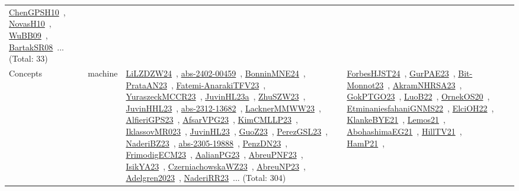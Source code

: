 {\begin{longtable}{lp{3cm}>{\raggedright\arraybackslash}p{6cm}>{\raggedright\arraybackslash}p{6cm}>{\raggedright\arraybackslash}p{8cm}}
\href{../works/ChenGPSH10.pdf}{ChenGPSH10}~\cite{ChenGPSH10}, \href{../works/NovasH10.pdf}{NovasH10}~\cite{NovasH10}, \href{../works/WuBB09.pdf}{WuBB09}~\cite{WuBB09}, \href{../works/BartakSR08.pdf}{BartakSR08}~\cite{BartakSR08}... (Total: 33)\\
\index{machine}\index{Concepts!machine}Concepts & machine & \href{../works/LiLZDZW24.pdf}{LiLZDZW24}~\cite{LiLZDZW24}, \href{../works/abs-2402-00459.pdf}{abs-2402-00459}~\cite{abs-2402-00459}, \href{../works/BonninMNE24.pdf}{BonninMNE24}~\cite{BonninMNE24}, \href{../works/PrataAN23.pdf}{PrataAN23}~\cite{PrataAN23}, \href{../works/Fatemi-AnarakiTFV23.pdf}{Fatemi-AnarakiTFV23}~\cite{Fatemi-AnarakiTFV23}, \href{../works/YuraszeckMCCR23.pdf}{YuraszeckMCCR23}~\cite{YuraszeckMCCR23}, \href{../works/JuvinHL23a.pdf}{JuvinHL23a}~\cite{JuvinHL23a}, \href{../works/ZhuSZW23.pdf}{ZhuSZW23}~\cite{ZhuSZW23}, \href{../works/JuvinHHL23.pdf}{JuvinHHL23}~\cite{JuvinHHL23}, \href{../works/abs-2312-13682.pdf}{abs-2312-13682}~\cite{abs-2312-13682}, \href{../works/LacknerMMWW23.pdf}{LacknerMMWW23}~\cite{LacknerMMWW23}, \href{../works/AlfieriGPS23.pdf}{AlfieriGPS23}~\cite{AlfieriGPS23}, \href{../works/AfsarVPG23.pdf}{AfsarVPG23}~\cite{AfsarVPG23}, \href{../works/KimCMLLP23.pdf}{KimCMLLP23}~\cite{KimCMLLP23}, \href{../works/IklassovMR023.pdf}{IklassovMR023}~\cite{IklassovMR023}, \href{../works/JuvinHL23.pdf}{JuvinHL23}~\cite{JuvinHL23}, \href{../works/GuoZ23.pdf}{GuoZ23}~\cite{GuoZ23}, \href{../works/PerezGSL23.pdf}{PerezGSL23}~\cite{PerezGSL23}, \href{../works/NaderiBZ23.pdf}{NaderiBZ23}~\cite{NaderiBZ23}, \href{../works/abs-2305-19888.pdf}{abs-2305-19888}~\cite{abs-2305-19888}, \href{../works/PenzDN23.pdf}{PenzDN23}~\cite{PenzDN23}, \href{../works/FrimodigECM23.pdf}{FrimodigECM23}~\cite{FrimodigECM23}, \href{../works/AalianPG23.pdf}{AalianPG23}~\cite{AalianPG23}, \href{../works/AbreuPNF23.pdf}{AbreuPNF23}~\cite{AbreuPNF23}, \href{../works/IsikYA23.pdf}{IsikYA23}~\cite{IsikYA23}, \href{../works/CzerniachowskaWZ23.pdf}{CzerniachowskaWZ23}~\cite{CzerniachowskaWZ23}, \href{../works/AbreuNP23.pdf}{AbreuNP23}~\cite{AbreuNP23}, \href{../works/Adelgren2023.pdf}{Adelgren2023}~\cite{Adelgren2023}, \href{../works/NaderiRR23.pdf}{NaderiRR23}~\cite{NaderiRR23}... (Total: 304) & \href{../works/ForbesHJST24.pdf}{ForbesHJST24}~\cite{ForbesHJST24}, \href{../works/GurPAE23.pdf}{GurPAE23}~\cite{GurPAE23}, \href{../works/Bit-Monnot23.pdf}{Bit-Monnot23}~\cite{Bit-Monnot23}, \href{../works/AkramNHRSA23.pdf}{AkramNHRSA23}~\cite{AkramNHRSA23}, \href{../works/GokPTGO23.pdf}{GokPTGO23}~\cite{GokPTGO23}, \href{../works/LuoB22.pdf}{LuoB22}~\cite{LuoB22}, \href{../works/OrnekOS20.pdf}{OrnekOS20}~\cite{OrnekOS20}, \href{../works/EtminaniesfahaniGNMS22.pdf}{EtminaniesfahaniGNMS22}~\cite{EtminaniesfahaniGNMS22}, \href{../works/ElciOH22.pdf}{ElciOH22}~\cite{ElciOH22}, \href{../works/KlankeBYE21.pdf}{KlankeBYE21}~\cite{KlankeBYE21}, \href{../works/Lemos21.pdf}{Lemos21}~\cite{Lemos21}, \href{../works/AbohashimaEG21.pdf}{AbohashimaEG21}~\cite{AbohashimaEG21}, \href{../works/HillTV21.pdf}{HillTV21}~\cite{HillTV21}, \href{../works/HamP21.pdf}{HamP21}~\cite{HamP21}, 
\end{longtable}}

